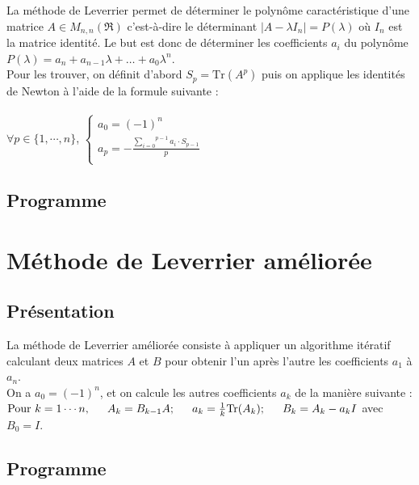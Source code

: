 \documentclass{report}
\begin{document}
      La méthode de Leverrier permet de déterminer le polynôme caractéristique d'une matrice $A \in M_{n,n}(\Re)$ c'est-à-dire le déterminant $|A-\lambda I_n| = P(\lambda)$ où $I_n$ est la matrice identité. Le but est donc de déterminer les coefficients $a_i$ du polynôme $P(\lambda) = a_n + a_{n-1}\lambda + \dots + a_{0}\lambda^n$.\\
      
      Pour les trouver, on définit d'abord $S_p = \text{Tr}(A^p)$ puis on applique les identités de Newton à l'aide de la formule suivante : \\ \\
      $\forall p \in \{1,\cdots,n\}$, \indent
      $\left\{
      \begin{array}{l }
	a_{0} = (-1)^n \\
	a_{p} = -\frac{{\overset{p-1}{\underset{i=0}{\sum}}} a_{i} \cdot S_{p-1}} {p} \\
	\end{array} \right.$
      \subsection{Programme}
	
    \section{Méthode de Leverrier améliorée}
      \subsection{Présentation}
	La méthode de Leverrier améliorée consiste à appliquer un algorithme itératif calculant deux matrices $A$ et $B$ pour obtenir l'un après l'autre les coefficients $a_1$ à $a_n$.\\
	On a $a_{0}=(-1)^{n}$, et on calcule les autres coefficients $a_{k}$ de la manière suivante : \\
	$\text{Pour } k=1 \cdots n, \indent A_{k}=B_{k-1}A ; \indent a_{k}=\frac{1}{k}\text{Tr}(A_{k}) ; \indent B_{k}=A_{k}-a_{k}I$ \indent avec $B_{0}=I$.
	
	
      \subsection{Programme}
	
	\newpage
\end{document}
